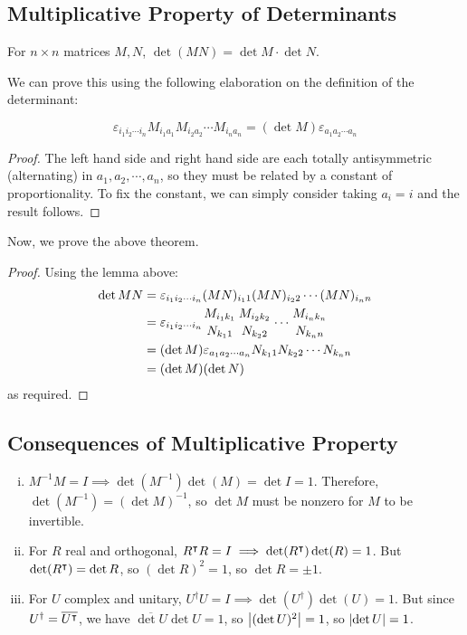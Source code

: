 \documentclass{article}
\begin{document}
	\subsection{Multiplicative Property of Determinants}
	\begin{theorem}
		For $n\times n$ matrices $M, N$, $\det (MN) = \det M \cdot \det N$.
	\end{theorem}
	\noindent We can prove this using the following elaboration on the definition of the determinant:
	\begin{lemma}
		\[ \varepsilon_{i_1 i_2 \cdots i_n} M_{i_1 a_1} M_{i_2 a_2} \cdots M_{i_n a_n} = (\det M) \varepsilon_{a_1 a_2 \cdots a_n} \]
	\end{lemma}
	\begin{proof}
		The left hand side and right hand side are each totally antisymmetric (alternating) in $a_1, a_2, \cdots, a_n$, so they must be related by a constant of proportionality. To fix the constant, we can simply consider taking $a_i = i$ and the result follows.
	\end{proof}
	\noindent Now, we prove the above theorem.
	\begin{proof}
		Using the lemma above:
		\begin{align*}
			\det MN &= \varepsilon_{i_1 i_2 \cdots i_n} (MN)_{i_1 1} (MN)_{i_2 2} \cdots (MN)_{i_n n} \\
			&= \varepsilon_{i_1 i_2 \cdots i_n} {M_{i_1 k_1} \atop N_{k_1 1}} {M_{i_2 k_2} \atop N_{k_2 2}} \cdots {M_{i_n k_n} \atop N_{k_n n}} \\
			&= (\det M) \varepsilon_{a_1 a_2 \cdots a_n} N_{k_1 1} N_{k_2 2} \cdots N_{k_n n} \\
			&= (\det M)(\det N)
		\end{align*}
		as required.
	\end{proof}

	\subsection{Consequences of Multiplicative Property}
	\begin{enumerate}[(i)]
		\item $M^{-1}M = I \implies \det(M^{-1}) \det(M) = \det I = 1$. Therefore, $\det (M^{-1}) = (\det M)^{-1}$, so $\det M$ must be nonzero for $M$ to be invertible.
		\item For $R$ real and orthogonal, $R^\intercal R = I \implies \det(R^\intercal) \det(R) = 1$. But $\det (R^\intercal) = \det R$, so $(\det R)^2 = 1$, so $\det R = \pm 1$.
		\item For $U$ complex and unitary, $U^\dagger U = I \implies \det(U^\dagger) \det(U) = 1$. But since $U^\dagger = \overline{U^\intercal}$, we have $\overline{\det U} \det U = 1$, so $\abs{(\det U)^2} = 1$, so $\abs{\det U} = 1$.
	\end{enumerate}
\end{document}

